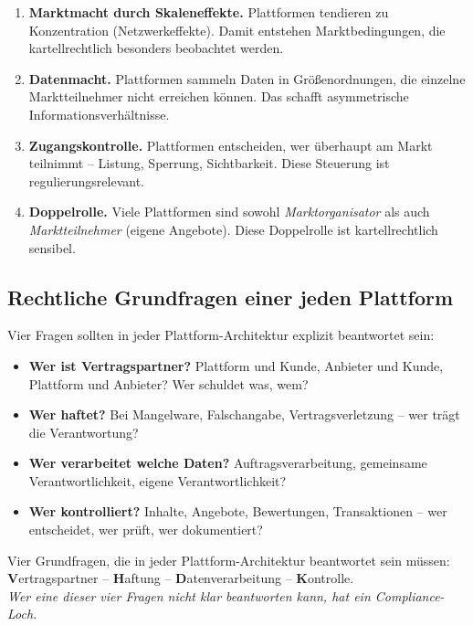 \documentclass[11pt,a4paper,oneside]{article}
\newcommand{\caveatfontfallback}{\itshape}
\newcommand\caveatfont{\caveatfontfallback}%
\newcommand{\akzent}[1]{{\caveatfont\color{lpAmber}#1}}
\newcommand{\fachbegriff}[1]{\textbf{#1}}
\begin{document}
\begin{enumerate}
  \item \fachbegriff{Marktmacht durch Skaleneffekte.} Plattformen tendieren zu Konzentration (Netzwerkeffekte). Damit entstehen Marktbedingungen, die kartellrechtlich besonders beobachtet werden.
  \item \fachbegriff{Datenmacht.} Plattformen sammeln Daten in Größenordnungen, die einzelne Marktteilnehmer nicht erreichen können. Das schafft asymmetrische Informationsverhältnisse.
  \item \fachbegriff{Zugangskontrolle.} Plattformen entscheiden, wer überhaupt am Markt teilnimmt -- Listung, Sperrung, Sichtbarkeit. Diese Steuerung ist regulierungsrelevant.
  \item \fachbegriff{Doppelrolle.} Viele Plattformen sind sowohl \emph{Marktorganisator} als auch \emph{Marktteilnehmer} (eigene Angebote). Diese Doppelrolle ist kartellrechtlich sensibel.
\end{enumerate}

\subsection{Rechtliche Grundfragen einer jeden Plattform}

Vier Fragen sollten in jeder Plattform-Architektur explizit beantwortet sein:

\begin{itemize}
  \item \textbf{Wer ist Vertragspartner?} Plattform und Kunde, Anbieter und Kunde, Plattform und Anbieter? Wer schuldet was, wem?
  \item \textbf{Wer haftet?} Bei Mangelware, Falschangabe, Vertragsverletzung -- wer trägt die Verantwortung?
  \item \textbf{Wer verarbeitet welche Daten?} Auftragsverarbeitung, gemeinsame Verantwortlichkeit, eigene Verantwortlichkeit?
  \item \textbf{Wer kontrolliert?} Inhalte, Angebote, Bewertungen, Transaktionen -- wer entscheidet, wer prüft, wer dokumentiert?
\end{itemize}

\begin{eselsbox}[Eselsbrücke: \akzent{V-H-D-K}]
Vier Grundfragen, die in jeder Plattform-Architektur beantwortet sein müssen:\\[2pt]
\textbf{V}ertragspartner -- \textbf{H}aftung -- \textbf{D}atenverarbeitung -- \textbf{K}ontrolle.\\[2pt]
\emph{Wer eine dieser vier Fragen nicht klar beantworten kann, hat ein Compliance-Loch.}
\end{eselsbox}
\end{document}
